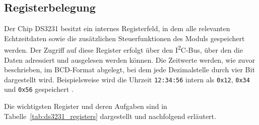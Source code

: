 

\subsection{Registerbelegung}
\label{subsec:ds3231_registers}

Der Chip DS3231 besitzt ein internes Registerfeld, in dem alle relevanten Echtzeitdaten 
sowie die zusätzlichen Steuerfunktionen des Moduls gespeichert werden. 
Der Zugriff auf diese Register erfolgt über den I\textsuperscript{2}C-Bus, über den die Daten adressiert und ausgelesen werden können. 
Die Zeitwerte werden, wie zuvor beschrieben, im BCD-Format abgelegt, bei dem jede Dezimalstelle durch vier Bit dargestellt wird. 
Beispielsweise wird die Uhrzeit \texttt{12:34:56} intern als \texttt{0x12}, \texttt{0x34} und \texttt{0x56} gespeichert \cite{MaximIntegrated:2023}.

\medskip
\noindent
Die wichtigsten Register und deren Aufgaben sind in Tabelle~\ref{tab:ds3231_registers} dargestellt 
und nachfolgend erläutert.

